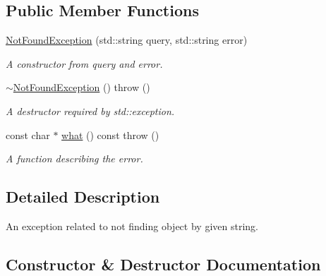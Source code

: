 \subsection*{Public Member Functions}
\begin{DoxyCompactItemize}
\item 
\hyperlink{class_r_c_f_1_1_common_1_1_not_found_exception_a981160851582a79f993c054a3994af4a}{Not\+Found\+Exception} (std\+::string query, std\+::string error)
\begin{DoxyCompactList}\small\item\em A constructor from query and error. \end{DoxyCompactList}\item 
\hypertarget{class_r_c_f_1_1_common_1_1_not_found_exception_af7699205d30b95939558a55442fd27fd}{}\hyperlink{class_r_c_f_1_1_common_1_1_not_found_exception_af7699205d30b95939558a55442fd27fd}{$\sim$\+Not\+Found\+Exception} ()  throw ()\label{class_r_c_f_1_1_common_1_1_not_found_exception_af7699205d30b95939558a55442fd27fd}

\begin{DoxyCompactList}\small\item\em A destructor required by std\+::exception. \end{DoxyCompactList}\item 
const char $\ast$ \hyperlink{class_r_c_f_1_1_common_1_1_not_found_exception_a1952dae8332c477283bf7193599a6be1}{what} () const   throw ()
\begin{DoxyCompactList}\small\item\em A function describing the error. \end{DoxyCompactList}\end{DoxyCompactItemize}


\subsection{Detailed Description}
An exception related to not finding object by given string. 

\subsection{Constructor \& Destructor Documentation}
\hypertarget{class_r_c_f_1_1_common_1_1_not_found_exception_a981160851582a79f993c054a3994af4a}{}
